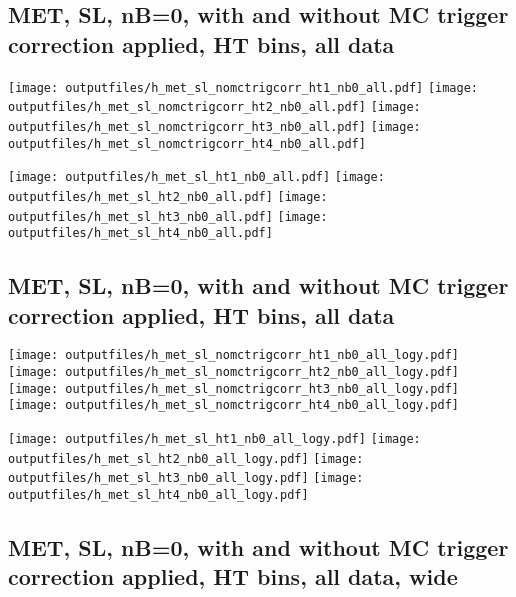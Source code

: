 \documentclass[11pt]{article}
\begin{document}
     \clearpage
     \subsection{ MET, SL, nB=0, with and without MC trigger correction applied, HT bins, all data}

    \noindent
     \texttt{[image: outputfiles/h\_met\_sl\_nomctrigcorr\_ht1\_nb0\_all.pdf]}
     \texttt{[image: outputfiles/h\_met\_sl\_nomctrigcorr\_ht2\_nb0\_all.pdf]}
     \texttt{[image: outputfiles/h\_met\_sl\_nomctrigcorr\_ht3\_nb0\_all.pdf]}
     \texttt{[image: outputfiles/h\_met\_sl\_nomctrigcorr\_ht4\_nb0\_all.pdf]}

    \noindent
     \texttt{[image: outputfiles/h\_met\_sl\_ht1\_nb0\_all.pdf]}
     \texttt{[image: outputfiles/h\_met\_sl\_ht2\_nb0\_all.pdf]}
     \texttt{[image: outputfiles/h\_met\_sl\_ht3\_nb0\_all.pdf]}
     \texttt{[image: outputfiles/h\_met\_sl\_ht4\_nb0\_all.pdf]}

    \clearpage
     \subsection{ MET, SL, nB=0, with and without MC trigger correction applied, HT bins, all data}

    \noindent
     \texttt{[image: outputfiles/h\_met\_sl\_nomctrigcorr\_ht1\_nb0\_all\_logy.pdf]}
     \texttt{[image: outputfiles/h\_met\_sl\_nomctrigcorr\_ht2\_nb0\_all\_logy.pdf]}
     \texttt{[image: outputfiles/h\_met\_sl\_nomctrigcorr\_ht3\_nb0\_all\_logy.pdf]}
     \texttt{[image: outputfiles/h\_met\_sl\_nomctrigcorr\_ht4\_nb0\_all\_logy.pdf]}


    \noindent
     \texttt{[image: outputfiles/h\_met\_sl\_ht1\_nb0\_all\_logy.pdf]}
     \texttt{[image: outputfiles/h\_met\_sl\_ht2\_nb0\_all\_logy.pdf]}
     \texttt{[image: outputfiles/h\_met\_sl\_ht3\_nb0\_all\_logy.pdf]}
     \texttt{[image: outputfiles/h\_met\_sl\_ht4\_nb0\_all\_logy.pdf]}


     \clearpage
     \subsection{ MET, SL, nB=0, with and without MC trigger correction applied, HT bins, all data, wide}
\end{document}
